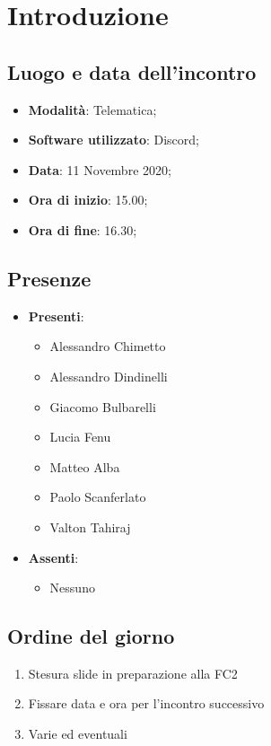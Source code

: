 \documentclass[]{article}
\begin{document}
	
	
	
	\newpage
	
	
	\section{Introduzione}
	\subsection{Luogo e data dell'incontro}
	\begin{itemize}
		\item \textbf{Modalità}: Telematica;
		\item \textbf{Software utilizzato}: Discord;
		\item \textbf{Data}: 11 Novembre 2020;
		\item \textbf{Ora di inizio}: 15.00;
		\item \textbf{Ora di fine}: 16.30;
	\end{itemize}
	
	\subsection{Presenze}
	\begin{itemize}
		\item \textbf{Presenti}: 
		\begin{itemize}
			\item Alessandro Chimetto
			\item Alessandro Dindinelli
			\item Giacomo Bulbarelli
			\item Lucia Fenu
			\item Matteo Alba
			\item Paolo Scanferlato
			\item Valton Tahiraj
		\end{itemize}
		\item \textbf{Assenti}:
		\begin{itemize}
			\item Nessuno
		\end{itemize}
	\end{itemize}
	
	\subsection{Ordine del giorno}
	\begin{enumerate}
		\item Stesura slide in preparazione alla FC2 
		\item Fissare data e ora per l'incontro successivo
		\item Varie ed eventuali
	\end{enumerate}
	
\end{document}
